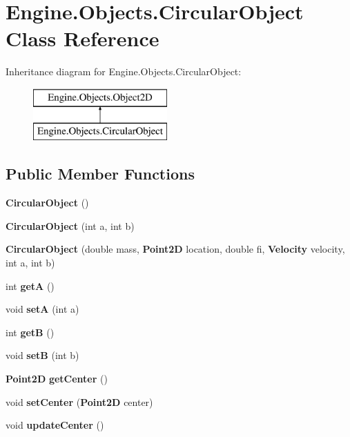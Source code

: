 \section{Engine.Objects.CircularObject Class Reference}
\label{class_engine_1_1_objects_1_1_circular_object}
Inheritance diagram for Engine.Objects.CircularObject:\begin{figure}[H]
\begin{center}
\leavevmode
\includegraphics[height=2.000000cm]{class_engine_1_1_objects_1_1_circular_object}
\end{center}
\end{figure}
\subsection*{Public Member Functions}
\begin{DoxyCompactItemize}
\item 
{\bf CircularObject} ()
\item 
{\bf CircularObject} (int a, int b)
\item 
{\bf CircularObject} (double mass, {\bf Point2D} location, double fi, {\bf Velocity} velocity, int a, int b)
\item 
int {\bf getA} ()
\item 
void {\bf setA} (int a)
\item 
int {\bf getB} ()
\item 
void {\bf setB} (int b)
\item 
{\bf Point2D} {\bfseries getCenter} ()\label{class_engine_1_1_objects_1_1_circular_object_a154e248dce79ba14bdb9ba0d377235ec}

\item 
void {\bfseries setCenter} ({\bf Point2D} center)\label{class_engine_1_1_objects_1_1_circular_object_a824b3808845ee9afcd8bee341bb08b11}

\item 
void {\bfseries updateCenter} ()\label{class_engine_1_1_objects_1_1_circular_object_ae651728538199280364efa7e1e96576e}

\end{DoxyCompactItemize}
